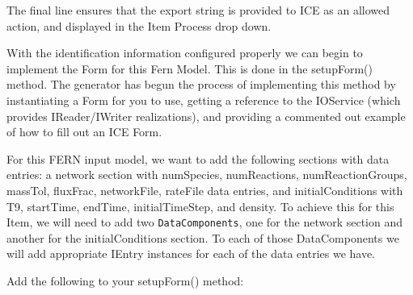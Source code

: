 \documentclass{article}
\begin{document}
The final line ensures that the export string is provided to ICE as an allowed
action, and displayed in the Item Process drop down.

With the identification information configured properly we can begin to
implement the Form for this Fern Model. This is done in the setupForm() method.
The generator has begun the process of implementing this method by instantiating
a Form for you to use, getting a reference to the IOService (which provides
IReader/IWriter realizations), and providing a commented out example of how to
fill out an ICE Form.

For this FERN input model, we want to add the following sections with data
entries: a network section with 
numSpecies, numReactions, numReactionGroups, massTol, fluxFrac, networkFile,
rateFile data entries, and initialConditions with T9, startTime, endTime,
initialTimeStep, and density. To achieve this for this Item, we will need to add
two \texttt{DataComponents}, one for the network section and another for the
initialConditions section. To each of those DataComponents we will add
appropriate IEntry instances for each of the data entries we have. 

Add the following to your setupForm() method: 
\end{document}
